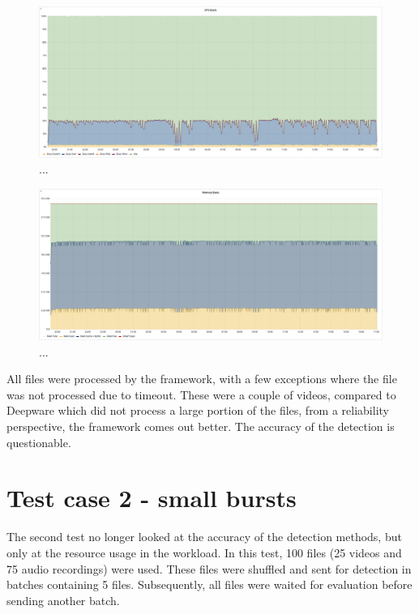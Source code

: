 \begin{figure}[H]
    \centering
    \includegraphics[width=1\linewidth]{other-fig/tests/cdf_cpu.png}
    \caption{...}
\end{figure}

\begin{figure}[H]
    \centering
    \includegraphics[width=1\linewidth]{other-fig/tests/cdf_ram.png}
    \caption{...}
\end{figure}

All files were processed by the framework, with a few exceptions where the file was not processed due to timeout. These were a couple of videos, compared to Deepware which did not process a large portion of the files, from a reliability perspective, the framework comes out better. The accuracy of the detection is questionable.

\section{Test case 2 - small bursts}

The second test no longer looked at the accuracy of the detection methods, but only at the resource usage in the workload. In this test, 100 files (25 videos and 75 audio recordings) were used. These files were shuffled and sent for detection in batches containing 5 files. Subsequently, all files were waited for evaluation before sending another batch.


